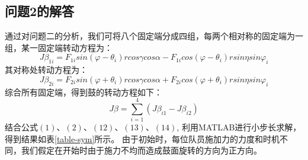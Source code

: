 \documentclass{cumcm}
\begin{document}
\subsection{问题2的解答}
通过对问题二的分析，我们可将八个固定端分成四组，每两个相对称的固定端为一组，某一固定端转动方程为：
\begin{equation}
J\beta_{1i}= F_{1i}sin(\varphi-\theta_i)rcos\gamma cos\alpha- F_{1i}cos(\varphi-\theta_i)rsin\eta sin\varphi_i
\end{equation}
其对称处转动方程为：
\begin{equation}
J \beta_{2i}= F_{2i}sin(\varphi+\theta_i)rcos\gamma cos\alpha+F_{2i}cos(\varphi+\theta_i)rsin\eta sin\varphi_i
\end{equation}
综合所有固定端，得到鼓的转动方程如下：
\begin{equation}
J \beta=\sum_{i=1}^4 (J\beta_{i1}-J\beta_{i2})
\end{equation}
\quad \quad
结合公式$(1)$、$(2)$、$(12)$、$(13)$、$(14)$, 利用MATLAB进行小步长求解，得到结果如表\ref{table-sym}所示。
由于初始时，每位队员施加力的力度和时机不同，我们假定在开始时由于施力不均而造成鼓面旋转的方向为正方向。
\end{document}
